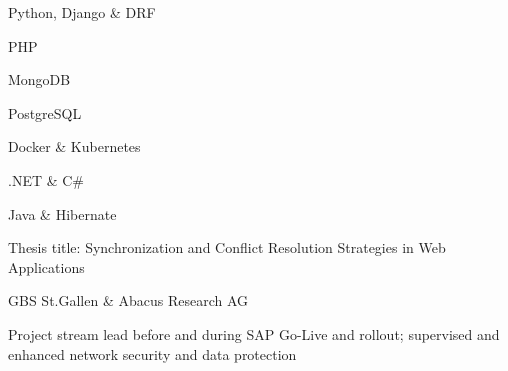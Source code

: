 Python, Django \& DRF \hfill{}\vspace{0.3cm}

PHP \hfill{}\vspace{0.3cm}

MongoDB \hfill{}\vspace{0.3cm}

PostgreSQL \hfill{}\vspace{0.3cm}

Docker \& Kubernetes \hfill{}\vspace{0.3cm}

.NET \& C\# \hfill{}\vspace{0.3cm}

Java \& Hibernate \hfill{}\vspace{0.3cm}



Thesis title: Synchronization and Conflict Resolution Strategies in Web Applications
\medskip


GBS St.Gallen \& Abacus Research AG







Project stream lead before and during SAP Go-Live and rollout;
supervised and enhanced network security and data protection